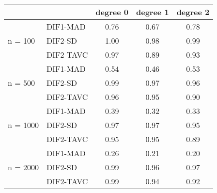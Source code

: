 \begin{tabular}{|l|l|c|c|c|}
  \hline
 &  & degree 0 & degree 1 & degree 2 \\ 
  \hline
 & DIF1-MAD & 0.76 & 0.67 & 0.78 \\ 
  n = 100 & DIF2-SD & 1.00 & 0.98 & 0.99 \\ 
   & DIF2-TAVC & 0.97 & 0.89 & 0.93 \\ 
   & DIF1-MAD & 0.54 & 0.46 & 0.53 \\ 
  n = 500 & DIF2-SD & 0.99 & 0.97 & 0.96 \\ 
   & DIF2-TAVC & 0.96 & 0.95 & 0.90 \\ 
   & DIF1-MAD & 0.39 & 0.32 & 0.33 \\ 
  n = 1000 & DIF2-SD & 0.97 & 0.97 & 0.95 \\ 
   & DIF2-TAVC & 0.95 & 0.95 & 0.89 \\ 
   & DIF1-MAD & 0.26 & 0.21 & 0.20 \\ 
  n = 2000 & DIF2-SD & 0.99 & 0.96 & 0.97 \\ 
   & DIF2-TAVC & 0.99 & 0.94 & 0.92 \\ 
   \hline
\end{tabular}
